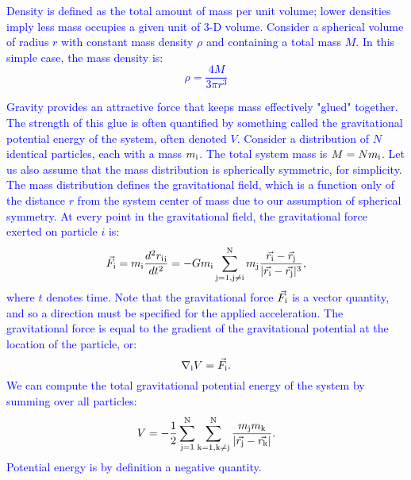 \documentclass[main.tex]{subfiles}
\begin{document}
\begin{tcolorbox}[sharp corners, colback=blue!30, colframe=blue!80!blue, title=Mass Density$^5$]
\par \textcolor{blue} {\nar Density is defined as the total amount of mass per unit volume; lower densities imply less mass occupies a given unit of 3-D volume.  Consider a spherical volume of radius $r$ with constant mass density $\rho$ and containing a total mass $M$.  In this simple case, the mass density is:
\begin{equation}
\rho = \frac{4M}{3{\pi}r^3}
\end{equation}
}  
\end{tcolorbox}

\begin{tcolorbox}[sharp corners, colback=blue!30, colframe=blue!80!blue, title=Gravitational Potential Energy$^6$]
\par \textcolor{blue} {Gravity provides an attractive force that keeps mass effectively "glued" together.  The strength of this glue is often quantified by something called the gravitational potential energy of the system, often denoted $V$.  Consider a distribution of $N$ identical particles, each with a mass $m_{\rm i}$.  The total system mass is $M = Nm_{\rm i}$.  Let us also assume that the mass distribution is spherically symmetric, for simplicity.  The mass distribution defines the gravitational field, which is a function only of the distance $r$ from the system center of mass due to our assumption of spherical symmetry.  At every point in the gravitational field, the gravitational force exerted on particle $i$ is:
\begin{equation}
\vec{F}_{\rm i} = m_{\rm i}\frac{d^2{r_{\rm i}}_{\rm i}}{dt^2} = -Gm_{\rm i}\sum_{\rm j=1,j \ne i}^{\rm N}m_{\rm j}\frac{\vec{r_{\rm i}} - \vec{r}_{\rm j}}{|\vec{r_{\rm i}} - \vec{r_{\rm j}}|^3},
\label{eqn:force}
\end{equation}
where $t$ denotes time.  Note that the gravitational force $\vec{F}_{\rm i}$ is a vector quantity, and so a direction must be specified for the applied acceleration.  The gravitational force is equal to the gradient of the gravitational potential at the location of the particle, or:
\begin{equation}
\nabla_{\rm i}V = \vec{F}_{\rm i}.
\end{equation}
We can compute the total gravitational potential energy of the system by summing over all particles:
\begin{equation}
V = -\frac{1}{2}\sum_{\rm j=1}^{\rm N}\sum_{\rm k=1, k \ne j}^{\rm N}\frac{m_{\rm j}m_{\rm k}}{|\vec{r_{\rm j}} - \vec{r_{\rm k}}|}.
\end{equation}
Potential energy is by definition a negative quantity.}
\end{tcolorbox}
\end{document}
